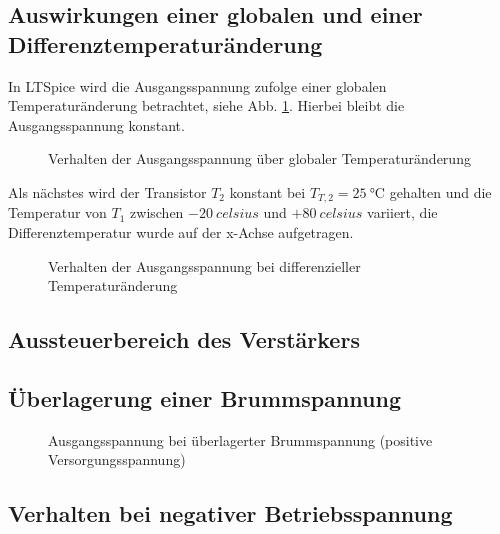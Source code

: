 \subsection{Auswirkungen einer globalen und einer Differenztemperaturänderung}
In LTSpice wird die Ausgangsspannung zufolge einer globalen Temperaturänderung betrachtet, siehe Abb. \ref{fig_Kap5_08:Temp}. Hierbei bleibt die Ausgangsspannung konstant.

\begin{figure}[H]
	\centering \small
	\scalebox{0.9}{}
	\caption{Verhalten der Ausgangsspannung über globaler Temperaturänderung}
	\label{fig_Kap5_08:Temp}
\end{figure}

Als nächstes wird der Transistor $T_2$ konstant bei $T_{T,2} = \SI{25}{\celsius}$ gehalten und die Temperatur von $T_1$ zwischen $-\SI{20}{celsius}$ und $+\SI{80}{celsius}$ variiert, die Differenztemperatur wurde auf der x-Achse aufgetragen.

\begin{figure}[H]
	\centering \small
	\scalebox{0.9}{}
	\caption{Verhalten der Ausgangsspannung bei differenzieller Temperaturänderung}
	\label{fig_Kap5_09:Temp}
\end{figure}

\subsection{Aussteuerbereich des Verstärkers}


\subsection{Überlagerung einer Brummspannung}

\begin{figure}[H]
	\centering \small
	\scalebox{0.9}{}
	\caption{Ausgangsspannung bei überlagerter Brummspannung (positive Versorgungsspannung)}
	\label{fig_Kap5_11:Brumm}
\end{figure}

\subsection{Verhalten bei negativer Betriebsspannung}

